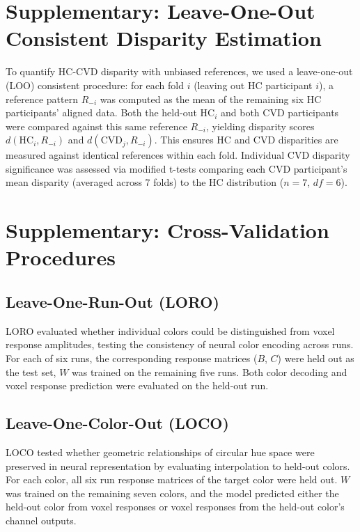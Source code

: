 \documentclass[a4paper,11pt]{article}
\begin{document}

\section*{Supplementary: Leave-One-Out Consistent Disparity Estimation}

To quantify HC-CVD disparity with unbiased references, we used a leave-one-out (LOO) consistent procedure: for each fold $i$ (leaving out HC participant $i$), a reference pattern $R_{-i}$ was computed as the mean of the remaining six HC participants' aligned data. Both the held-out $\text{HC}_i$ and both CVD participants were compared against this same reference $R_{-i}$, yielding disparity scores $d(\text{HC}_i, R_{-i})$ and $d(\text{CVD}_j, R_{-i})$. This ensures HC and CVD disparities are measured against identical references within each fold. Individual CVD disparity significance was assessed via  modified t-tests comparing each CVD participant's mean disparity (averaged across 7 folds) to the HC distribution ($n=7$, $df=6$).



\section*{Supplementary: Cross-Validation Procedures}

\subsection*{Leave-One-Run-Out (LORO)}

LORO evaluated whether individual colors could be distinguished from voxel response amplitudes, testing the consistency of neural color encoding across runs. For each of six runs, the corresponding response matrices ($B$, $C$) were held out as the test set, $W$ was trained on the remaining five runs. Both color decoding and voxel response prediction were evaluated on the held-out run.

\subsection*{Leave-One-Color-Out (LOCO)}

LOCO tested whether geometric relationships of circular hue space were preserved in neural representation by evaluating interpolation to held-out colors. For each color, all six run response matrices of the target color were held out. $W$ was trained on the remaining seven colors, and the model predicted either the held-out color from voxel responses or voxel responses from the held-out color's channel outputs.
\end{document}
